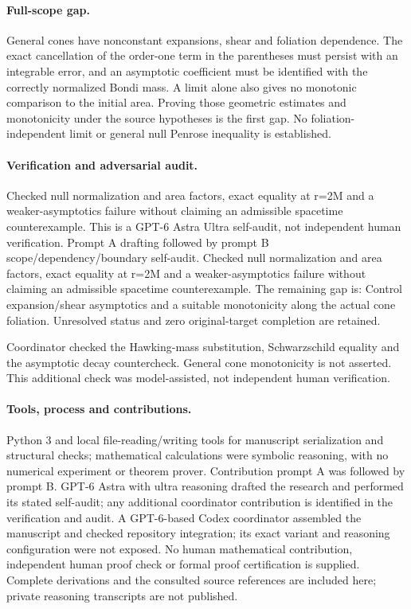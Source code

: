 \documentclass[11pt]{article}
\begin{document}
\paragraph{Full-scope gap.} General cones have nonconstant expansions, shear and foliation dependence. The exact cancellation of the order-one term in the parentheses must persist with an integrable error, and an asymptotic coefficient must be identified with the correctly normalized Bondi mass. A limit alone also gives no monotonic comparison to the initial area. Proving those geometric estimates and monotonicity under the source hypotheses is the first gap. No foliation-independent limit or general null Penrose inequality is established.

\paragraph{Verification and adversarial audit.}
Checked null normalization and area factors, exact equality at r=2M and a weaker-asymptotics failure without claiming an admissible spacetime counterexample. This is a GPT-6 Astra Ultra self-audit, not independent human verification. Prompt A drafting followed by prompt B scope/dependency/boundary self-audit. Checked null normalization and area factors, exact equality at r=2M and a weaker-asymptotics failure without claiming an admissible spacetime counterexample. The remaining gap is: Control expansion/shear asymptotics and a suitable monotonicity along the actual cone foliation. Unresolved status and zero original-target completion are retained.

Coordinator checked the Hawking-mass substitution, Schwarzschild equality and the asymptotic decay countercheck. General cone monotonicity is not asserted. This additional check was model-assisted, not independent human verification.

\paragraph{Tools, process and contributions.}
Python 3 and local file-reading/writing tools for manuscript serialization and structural checks; mathematical calculations were symbolic reasoning, with no numerical experiment or theorem prover. Contribution prompt A was followed by prompt B. GPT-6 Astra with ultra reasoning drafted the research and performed its stated self-audit; any additional coordinator contribution is identified in the verification and audit. A GPT-6-based Codex coordinator assembled the manuscript and checked repository integration; its exact variant and reasoning configuration were not exposed. No human mathematical contribution, independent human proof check or formal proof certification is supplied. Complete derivations and the consulted source references are included here; private reasoning transcripts are not published.
\end{document}
